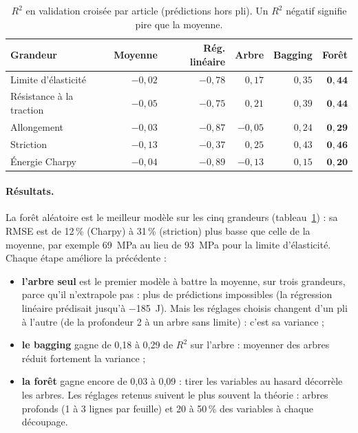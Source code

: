 \begin{table}[!htbp]
  \centering\small
  \begin{tabular}{@{}l r r r r r@{}}
    \toprule
    \textbf{Grandeur} & \textbf{Moyenne} & \textbf{Rég. linéaire} & \textbf{Arbre} &
    \textbf{Bagging} & \textbf{Forêt} \\
    \midrule
    Limite d'élasticité      & $-0{,}02$ & $-0{,}78$ & $0{,}17$  & $0{,}35$ & $\mathbf{0{,}44}$ \\
    Résistance à la traction & $-0{,}05$ & $-0{,}75$ & $0{,}21$  & $0{,}39$ & $\mathbf{0{,}44}$ \\
    Allongement              & $-0{,}03$ & $-0{,}87$ & $-0{,}05$ & $0{,}24$ & $\mathbf{0{,}29}$ \\
    Striction                & $-0{,}13$ & $-0{,}37$ & $0{,}25$  & $0{,}43$ & $\mathbf{0{,}46}$ \\
    Énergie Charpy           & $-0{,}04$ & $-0{,}89$ & $-0{,}13$ & $0{,}15$ & $\mathbf{0{,}20}$ \\
    \bottomrule
  \end{tabular}
  \caption{$R^2$ en validation croisée par article (prédictions hors pli). Un $R^2$
    négatif signifie pire que la moyenne.}
  \label{tab:arbres}
\end{table}

\paragraph{Résultats.} La forêt aléatoire est le meilleur modèle sur les cinq grandeurs
(tableau~\ref{tab:arbres}) : sa RMSE est de 12\,\% (Charpy) à 31\,\% (striction) plus
basse que celle de la moyenne, par exemple \SI{69}{\mega\pascal} au lieu de
\SI{93}{\mega\pascal} pour la limite d'élasticité. Chaque étape améliore la précédente :
\begin{itemize}
  \item \textbf{l'arbre seul} est le premier modèle à battre la moyenne, sur trois
    grandeurs, parce qu'il n'extrapole pas : plus de prédictions impossibles (la
    régression linéaire prédisait jusqu'à \SI{-185}{\joule}). Mais les réglages choisis
    changent d'un pli à l'autre (de la profondeur 2 à un arbre sans limite) : c'est sa
    variance ;
  \item \textbf{le bagging} gagne de 0,18 à 0,29 de $R^2$ sur l'arbre : moyenner des
    arbres réduit fortement la variance ;
  \item \textbf{la forêt} gagne encore de 0,03 à 0,09 : tirer les variables au hasard
    décorrèle les arbres. Les réglages retenus suivent le plus souvent la théorie : arbres
    profonds (1 à 3 lignes par feuille) et 20 à 50\,\% des variables à chaque découpage.
\end{itemize}

